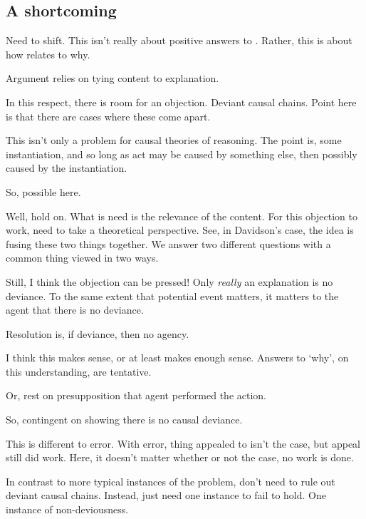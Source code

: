 \subsection{A shortcoming}
\label{sec:shortcoming}

\begin{note}
  \color{red}
  Need to shift.
  This isn't really about positive answers to \qzS{}.
  Rather, this is about how \qzS{} relates to why.
\end{note}

\begin{note}
  Argument relies on tying content to explanation.

  In this respect, there is room for an objection.
  Deviant causal chains.
  Point here is that there are cases where these come apart.

  This isn't only a problem for causal theories of reasoning.
  The point is, some instantiation, and so long as act may be caused by something else, then possibly caused by the instantiation.

  So, possible here.

  Well, hold on.
  What is need is the relevance of the content.
  For this objection to work, need to take a theoretical perspective.
  See, in Davidson's case, the idea is fusing these two things together.
  We answer two different questions with a common thing viewed in two ways.

  Still, I think the objection can be pressed!
  Only \emph{really} an explanation is no deviance.
  To the same extent that potential event matters, it matters to the agent that there is no deviance.

  {
    \color{red}
    Resolution is, if deviance, then no agency.
  }

  I think this makes sense, or at least makes enough sense.
  Answers to `why', on this understanding, are tentative.

  Or, rest on presupposition that agent performed the action.

  So, contingent on showing there is no causal deviance.

  This is different to error.
  With error, thing appealed to isn't the case, but appeal still did work.
  Here, it doesn't matter whether or not the case, no work is done.

  In contrast to more typical instances of the problem, don't need to rule out deviant causal chains.
  Instead, just need one instance to fail to hold.
  One instance of non-deviousness.


\end{note}

